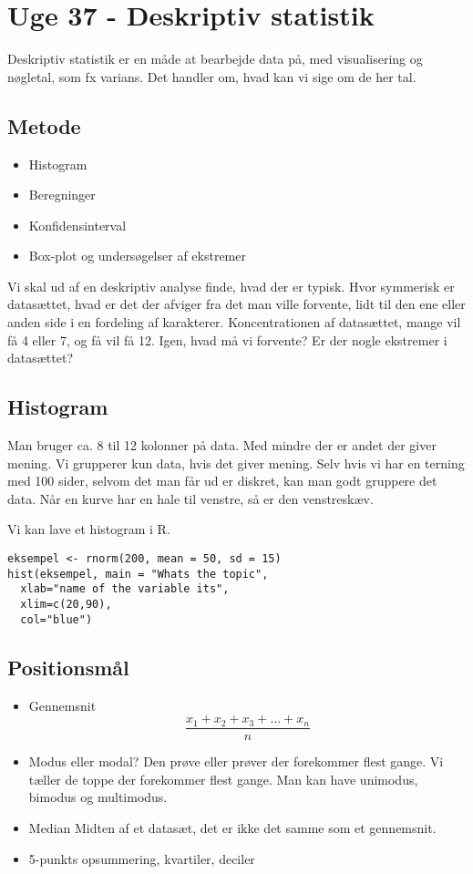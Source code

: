 \documentclass{article}
\begin{document}
\newpage
\section{Uge 37 - Deskriptiv statistik}
Deskriptiv statistik er en måde at bearbejde data på, med visualisering og
nøgletal, som fx varians. Det handler om, hvad kan vi sige om de her tal.

\subsection{Metode}
\begin{itemize}
  \item Histogram
  \item Beregninger
  \item Konfidensinterval
  \item Box-plot og undersøgelser af ekstremer
\end{itemize}

Vi skal ud af en deskriptiv analyse finde, hvad der er typisk. Hvor symmerisk er
datasættet, hvad er det der afviger fra det man ville forvente, lidt til den ene
eller anden side i en fordeling af karakterer. Koncentrationen af datasættet,
mange vil få 4 eller 7, og få vil få 12. Igen, hvad må vi forvente? Er der nogle
ekstremer i datasættet? 

\subsection{Histogram}
Man bruger ca. 8 til 12 kolonner på data. Med mindre der er andet der giver
mening. Vi grupperer kun data, hvis det giver mening. Selv hvis vi har en
terning med 100 sider, selvom det man får ud er diskret, kan man godt gruppere
det data. 
Når en kurve har en hale til venstre, så er den venstreskæv.


Vi kan lave et histogram i R.

\begin{lstlisting}
eksempel <- rnorm(200, mean = 50, sd = 15)
hist(eksempel, main = "Whats the topic",
  xlab="name of the variable its",
  xlim=c(20,90),
  col="blue")
\end{lstlisting}

\subsection{Positionsmål}

\begin{itemize}
  \item Gennemsnit
    \subitem $$\frac{x_1+x_2+x_3+\dots + x_n}{n}$$
  \item Modus eller modal?
    \subitem Den prøve eller prøver der forekommer flest gange. Vi tæller de
    toppe der forekommer flest gange. Man kan have unimodus, bimodus og
    multimodus.
  \item Median
    \subitem Midten af et datasæt, det er ikke det samme som et gennemsnit.
  \item 5-punkts opsummering, kvartiler, deciler
\end{itemize}
\end{document}
